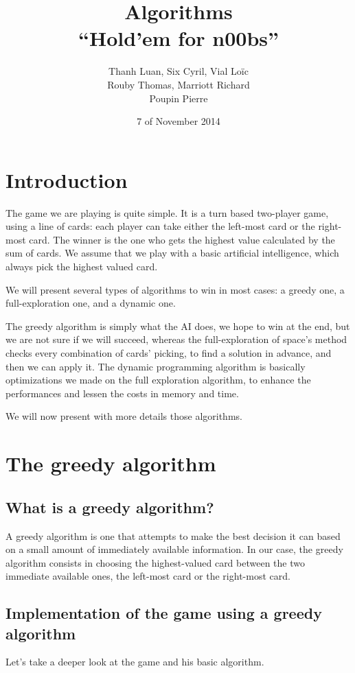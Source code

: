 \documentclass[11pt]{article}
\title{Algorithms \\
	\textbf{``Hold'em for n00bs''}}
\author{Thanh Luan, Six Cyril, Vial Loïc \\
			Rouby Thomas, Marriott Richard\\
			Poupin Pierre}
\date{7\up{th} of November 2014}
\begin{document}
\maketitle
\tableofcontents

\section{Introduction}
The game we are playing is quite simple. It is a turn based two-player game, using a line of cards: each player can take either the left-most card or the right-most card.
The winner is the one who gets the highest value calculated by the sum of cards.
We assume that we play with a basic artificial intelligence, which always pick the highest valued card.

We will present several types of algorithms to win in most cases: a greedy one, a full-exploration one, and a dynamic one.

The greedy algorithm is simply what the AI does, we hope to win at the end, but we are not sure if we will succeed, whereas the full-exploration of space's method checks every combination of cards' picking, to find a solution in advance, and then we can apply it.
The dynamic programming algorithm is basically optimizations we made on the full exploration algorithm, to enhance the performances and lessen the costs in memory and time.

We will now present with more details those algorithms.


\section{The greedy algorithm}
\subsection{What is a greedy algorithm?}

A greedy algorithm is one that attempts to make the best decision it can based on a small amount of immediately available information.
In our case, the greedy algorithm consists in  choosing the highest-valued card between the two immediate available ones, the left-most card or the right-most card.

\subsection{Implementation of the game using a greedy algorithm}
Let's take a deeper look at the game and his basic algorithm.
\end{document}
